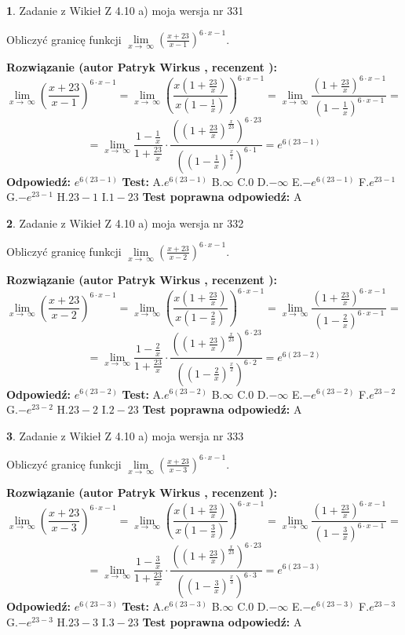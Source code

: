 \documentclass[12pt, a4paper]{article}
\theoremstyle{definition} %
\newtheorem{zad}{}
\newcommand{\zadStart}[1]{\begin{zad}#1\newline}
\newcommand{\zadStop}{\end{zad}}
\newcommand{\rozwStart}[2]{\noindent \textbf{Rozwiązanie (autor #1 , recenzent #2): }\newline}
\newcommand{\rozwStop}{\newline}
\newcommand{\odpStart}{\noindent \textbf{Odpowiedź:}\newline}
\newcommand{\odpStop}{\newline}
\newcommand{\testStart}{\noindent \textbf{Test:}\newline}
\newcommand{\testStop}{\newline}
\newcommand{\kluczStart}{\noindent \textbf{Test poprawna odpowiedź:}\newline}
\newcommand{\kluczStop}{\newline}
\begin{document}
\zadStart{Zadanie z Wikieł Z 4.10 a) moja wersja nr 331}


Obliczyć granicę funkcji  $\lim\limits_{x\to\ \infty}(\frac{x+23}{x-1})^{6\cdot x-1}$.
\zadStop
\rozwStart{Patryk Wirkus}{}
$$\lim\limits_{x\to\ \infty}(\frac{x+23}{x-1})^{6\cdot x-1} = \lim\limits_{x\to\ \infty}(\frac{x(1+\frac{23}{x})}{x(1-\frac{1}{x})})^{6\cdot x-1}=\lim\limits_{x\to\ \infty}\frac{(1+\frac{23}{x})^{6\cdot x-1}}{(1-\frac{1}{x})^{6\cdot x-1}}=$$
$$=\lim\limits_{x\to\ \infty}\frac{1-\frac{1}{x}}{1+\frac{23}{x}}\cdot\frac{((1+\frac{23}{x})^{\frac{x}{23}})^{6\cdot23}}{((1-\frac{1}{x})^{\frac{x}{1}})^{6\cdot1}}=e^{6(23-1)}$$
\rozwStop
\odpStart
$e^{6(23-1)}$
\odpStop
\testStart
A.$e^{6(23-1)}$ B.$\infty$ C.$0$ D.$-\infty$ E.$-e^{6(23-1)}$
F.$e^{23-1}$ G.$-e^{23-1}$
H.$23-1$
I.$1-23$
\testStop
\kluczStart
A
\kluczStop



\zadStart{Zadanie z Wikieł Z 4.10 a) moja wersja nr 332}


Obliczyć granicę funkcji  $\lim\limits_{x\to\ \infty}(\frac{x+23}{x-2})^{6\cdot x-1}$.
\zadStop
\rozwStart{Patryk Wirkus}{}
$$\lim\limits_{x\to\ \infty}(\frac{x+23}{x-2})^{6\cdot x-1} = \lim\limits_{x\to\ \infty}(\frac{x(1+\frac{23}{x})}{x(1-\frac{2}{x})})^{6\cdot x-1}=\lim\limits_{x\to\ \infty}\frac{(1+\frac{23}{x})^{6\cdot x-1}}{(1-\frac{2}{x})^{6\cdot x-1}}=$$
$$=\lim\limits_{x\to\ \infty}\frac{1-\frac{2}{x}}{1+\frac{23}{x}}\cdot\frac{((1+\frac{23}{x})^{\frac{x}{23}})^{6\cdot23}}{((1-\frac{2}{x})^{\frac{x}{2}})^{6\cdot2}}=e^{6(23-2)}$$
\rozwStop
\odpStart
$e^{6(23-2)}$
\odpStop
\testStart
A.$e^{6(23-2)}$ B.$\infty$ C.$0$ D.$-\infty$ E.$-e^{6(23-2)}$
F.$e^{23-2}$ G.$-e^{23-2}$
H.$23-2$
I.$2-23$
\testStop
\kluczStart
A
\kluczStop



\zadStart{Zadanie z Wikieł Z 4.10 a) moja wersja nr 333}


Obliczyć granicę funkcji  $\lim\limits_{x\to\ \infty}(\frac{x+23}{x-3})^{6\cdot x-1}$.
\zadStop
\rozwStart{Patryk Wirkus}{}
$$\lim\limits_{x\to\ \infty}(\frac{x+23}{x-3})^{6\cdot x-1} = \lim\limits_{x\to\ \infty}(\frac{x(1+\frac{23}{x})}{x(1-\frac{3}{x})})^{6\cdot x-1}=\lim\limits_{x\to\ \infty}\frac{(1+\frac{23}{x})^{6\cdot x-1}}{(1-\frac{3}{x})^{6\cdot x-1}}=$$
$$=\lim\limits_{x\to\ \infty}\frac{1-\frac{3}{x}}{1+\frac{23}{x}}\cdot\frac{((1+\frac{23}{x})^{\frac{x}{23}})^{6\cdot23}}{((1-\frac{3}{x})^{\frac{x}{3}})^{6\cdot3}}=e^{6(23-3)}$$
\rozwStop
\odpStart
$e^{6(23-3)}$
\odpStop
\testStart
A.$e^{6(23-3)}$ B.$\infty$ C.$0$ D.$-\infty$ E.$-e^{6(23-3)}$
F.$e^{23-3}$ G.$-e^{23-3}$
H.$23-3$
I.$3-23$
\testStop
\kluczStart
A
\kluczStop
\end{document}
